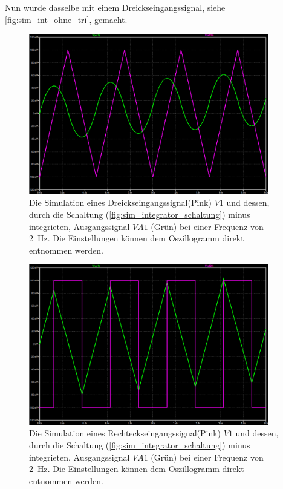 \documentclass[12pt,english,ngerman]{scrartcl}
\begin{document}
Nun wurde dasselbe mit einem Dreickseingangssignal, siehe
\autoref{fig:sim_int_ohne_tri}, gemacht.

\begin{figure}[H]
  \centering
    \includegraphics[width=\linewidth, height=7cm]{./figures/integrator/sim/umkehr_int/dreieck_100mv_t500ms.png}
  \caption{Die Simulation eines Dreickseingangssignal(Pink) $V1$ und dessen, durch
  die Schaltung (\autoref{fig:sim_integrator_schaltung}) minus integrieten,
Ausgangssignal $VA1$ (Grün) bei einer Frequenz von \SI{2}{\hertz}. Die Einstellungen
können dem Oszillogramm direkt entnommen werden.}
  \label{fig:sim_int_ohne_tri}
\end{figure}

\begin{figure}[H]
  \centering
    \includegraphics[width=\linewidth, height=7cm]{./figures/integrator/sim/umkehr_int/rechteck_100mv_t500ms.png}
  \caption{Die Simulation eines Rechteckseingangssignal(Pink) $V1$ und dessen, durch
  die Schaltung (\autoref{fig:sim_integrator_schaltung}) minus integrieten,
Ausgangssignal $VA1$ (Grün) bei einer Frequenz von \SI{2}{\hertz}. Die Einstellungen
können dem Oszillogramm direkt entnommen werden.}
  \label{fig:sim_int_ohne_rect}
\end{figure}
\end{document}
